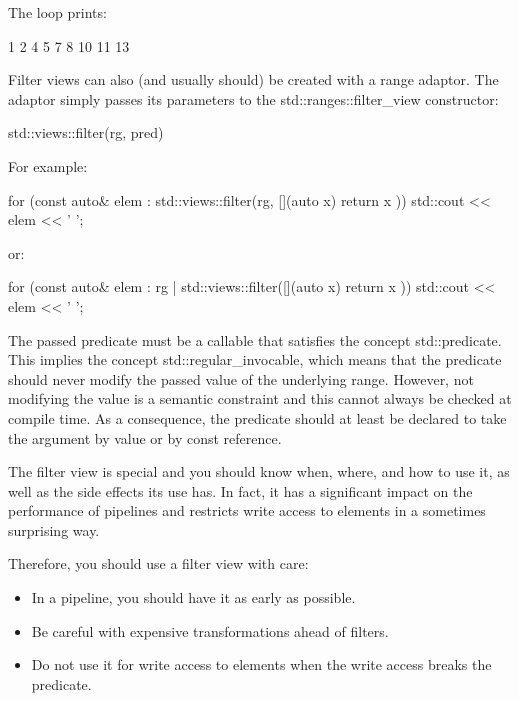 The loop prints:

\begin{shell}
1 2 4 5 7 8 10 11 13
\end{shell}


Filter views can also (and usually should) be created with a range adaptor. The adaptor simply passes its parameters to the std::ranges::filter\_view constructor:

\begin{cpp}
std::views::filter(rg, pred)
\end{cpp}

For example:

\begin{cpp}
for (const auto& elem : std::views::filter(rg, [](auto x) {
						return x %
					})) {
	std::cout << elem << ' ';
}
\end{cpp}

or:

\begin{cpp}
for (const auto& elem : rg | std::views::filter([](auto x) {
						return x %
					})) {
	std::cout << elem << ' ';
}
\end{cpp}

The passed predicate must be a callable that satisfies the concept std::predicate. This implies the concept std::regular\_invocable, which means that the predicate should never modify the passed value of the underlying range. However, not modifying the value is a semantic constraint and this cannot always be checked at compile time. As a consequence, the predicate should at least be declared to take the argument by value or by const reference.

The filter view is special and you should know when, where, and how to use it, as well as the side effects its use has. In fact, it has a significant impact on the performance of pipelines and restricts write access to elements in a sometimes surprising way.

Therefore, you should use a filter view with care:

\begin{itemize}
\item
In a pipeline, you should have it as early as possible.

\item
Be careful with expensive transformations ahead of filters.

\item
Do not use it for write access to elements when the write access breaks the predicate.
\end{itemize}

